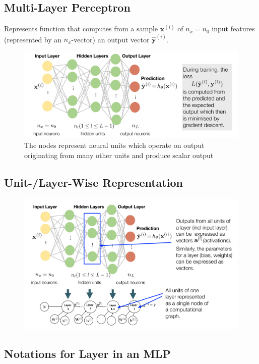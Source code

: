 \documentclass[11pt]{article}
\begin{document}
\subsection{Multi-Layer Perceptron}
Represents function that computes from a sample $\textbf{x}^{(i)}$ of $n_x = n_0$ input features (represented by an $n_x$-vector) an output vector $\widehat{\textbf{y}}^{(i)}$.

\begin{figure}[H]
	\centering
	\includegraphics[width=0.8\linewidth]{mlp_graph}
	\caption{The nodes represent neural units which operate on output originating from many other units and produce scalar output}
	\label{fig:mlpgraph}
\end{figure}

\subsection{Unit-/Layer-Wise Representation}

\noindent
\begin{figure}[H]
	\centering
	\includegraphics[width=0.9\linewidth]{mlp_layer_graph}
\end{figure}

\subsection{Notations for Layer in an MLP}
\end{document}

